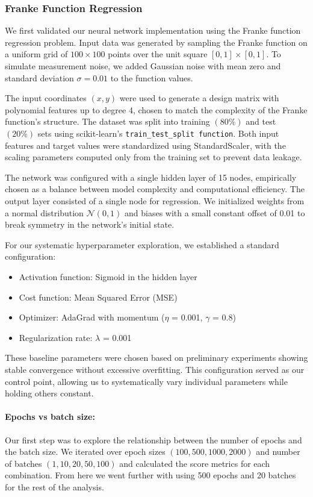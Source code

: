 \documentclass[aps,pra,english,notitlepage,reprint,nofootinbib]{revtex4-1}  %
\begin{document}
\subsubsection{Franke Function Regression}

We first validated our neural network implementation using the Franke function regression problem. Input data was generated by sampling the Franke function on a uniform grid of \( 100 \times 100 \) points over the unit square \( [0,1]\times[0,1] \). To simulate measurement noise, we added Gaussian noise with mean zero and standard deviation \( \sigma = 0.01 \) to the function values.

The input coordinates \( (x,y) \) were used to generate a design matrix with polynomial features up to degree 4, chosen to match the complexity of the Franke function's structure. The dataset was split into training \( (80\%) \) and test \( (20\%) \) sets using scikit-learn's \verb|train_test_split function|. Both input features and target values were standardized using StandardScaler, with the scaling parameters computed only from the training set to prevent data leakage.

The network was configured with a single hidden layer of 15 nodes, empirically chosen as a balance between model complexity and computational efficiency. The output layer consisted of a single node for regression. We initialized weights from a normal distribution \( \mathcal{N} (0,1) \) and biases with a small constant offset of 0.01 to break symmetry in the network's initial state.

For our systematic hyperparameter exploration, we established a standard configuration:
\begin{itemize}
    \item Activation function: Sigmoid in the hidden layer
    \item Cost function: Mean Squared Error (MSE)
    \item Optimizer: AdaGrad with momentum (\( \eta \) = 0.001, \( \gamma \) = 0.8)
    \item Regularization rate: \( \lambda \) = 0.001
\end{itemize}

These baseline parameters were chosen based on preliminary experiments showing stable convergence without excessive overfitting. This configuration served as our control point, allowing us to systematically vary individual parameters while holding others constant.

\paragraph*{Epochs vs batch size:}
Our first step was to explore the relationship between the number of epochs and the batch size. We iterated over epoch sizes \( (100, 500, 1000, 2000) \) and number of batches \( (1, 10, 20, 50, 100) \) and calculated the score metrics for each combination. From here we went further with using 500 epochs and 20 batches for the rest of the analysis.
\end{document}
